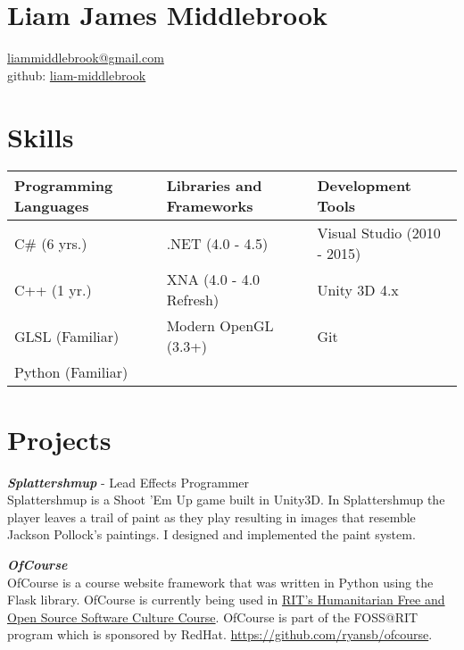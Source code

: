 \documentclass[line,margin]{res}
\begin{document}
\marginsize{.5in}{.5in}{1.0in}{.5in}

\section{Liam James Middlebrook}

\href{mailto:liammiddlebrook@gmail.com}{liammiddlebrook@gmail.com}\\
github: \href{https://github.com/liam-middlebrook}{liam-middlebrook}

\begin{resume}


\section{Skills}
\begin{table}[h]
\begin{tabular}{@{}lll@{}}
\toprule
Programming Languages & Libraries and Frameworks & Development Tools           \\ \midrule
C\# (6 yrs.)          & .NET (4.0 - 4.5)         & Visual Studio (2010 - 2015) \\
C++ (1 yr.)           & XNA (4.0 - 4.0 Refresh)  & Unity 3D 4.x                \\
GLSL (Familiar)       & Modern OpenGL (3.3+)     & Git                         \\
Python (Familiar)     &                          &                             \\ \bottomrule
\end{tabular}
\end{table}


\section{Projects}

{\textbf{\emph{Splattershmup}}} - Lead Effects Programmer\\
Splattershmup is a Shoot 'Em Up game built in Unity3D. In Splattershmup the player leaves
a trail of paint as they play resulting in images that resemble Jackson Pollock's paintings.
I designed and implemented the paint system.

{\textbf{\emph{OfCourse}}}\\
OfCourse is a course website framework that was written in Python using the Flask library.
OfCourse is currently being used in \href{http://hfoss-fossrit.rhcloud.com}{RIT's Humanitarian
Free and Open Source Software Culture Course}. OfCourse is part of the FOSS@RIT
program which is sponsored by RedHat. \url{https://github.com/ryansb/ofcourse}.


\end{resume}
\end{document}
